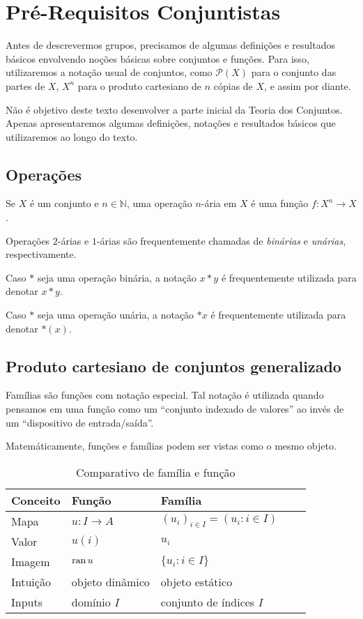
\section{Pré-Requisitos Conjuntistas}
Antes de descrevermos grupos, precisamos de algumas definições e resultados básicos envolvendo noções básicas sobre conjuntos e funções. Para isso, utilizaremos a notação usual de conjuntos, como $\mathcal P(X)$ para o conjunto das partes de $X$, $X^n$ para o produto cartesiano de $n$ cópias de $X$, e assim por diante.

Não é objetivo deste texto desenvolver a parte inicial da Teoria dos Conjuntos. Apenas apresentaremos algumas definições, notações e resultados básicos que utilizaremos ao longo do texto.
\subsection{Operações}

\begin{definition}
    Se $X$ é um conjunto e $n \in \mathbb N$, uma operação $n$-ária em $X$ é uma função $f:X^n\rightarrow X$.
\end{definition}

Operações $2$-árias e $1$-árias são frequentemente chamadas de \emph{binárias} e \emph{unárias}, respectivamente.

Caso $*$ seja uma operação binária, a notação $x*y$ é frequentemente utilizada para denotar $x*y$.

Caso $*$ seja uma operação unária, a notação $*x$ é frequentemente utilizada para denotar $*(x)$.
\subsection{Produto cartesiano de conjuntos generalizado}

Famílias são funções com notação especial. Tal notação é utilizada quando pensamos em uma função como um ``conjunto indexado de valores'' ao invés de um ``dispositivo de entrada/saída''.

Matemáticamente, funções e famílias podem ser vistas como o mesmo objeto.
\begin{table}[h]
    \centering
    \begin{tabular}{lllll}
        \hline
        \textbf{Conceito} & \textbf{Função} & \textbf{Família} \\ \hline
        Mapa & $u:I\rightarrow A$ & $(u_i)_{i \in I}=(u_i: i \in I)$ \\
        Valor & $u(i)$ & $u_i$ \\
        Imagem & $\operatorname{ran} u$ & $\{u_i: i \in I\}$\\
        Intuição & objeto dinâmico & objeto estático \\
        Inputs & domínio $I$ & conjunto de índices $I$ \\
        \hline
    \end{tabular}
    \caption{Comparativo de família e função}
\end{table}

